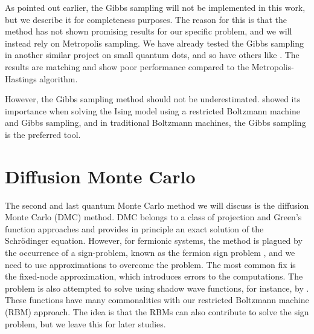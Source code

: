 As pointed out earlier, the Gibbs sampling will not be implemented in this work, but we describe it for completeness purposes. The reason for this is that the method has not shown promising results for our specific problem, and we will instead rely on Metropolis sampling. We have already tested the Gibbs sampling in another similar project on small quantum dots, and so have others like \citet{flugsrud_vilde_moe_solving_nodate}. The results are matching and show poor performance compared to the Metropolis-Hastings algorithm.

However, the Gibbs sampling method should not be underestimated. \citet{carleo_solving_2017} showed its importance when solving the Ising model using a restricted Boltzmann machine and Gibbs sampling, and in traditional Boltzmann machines, the Gibbs sampling is the preferred tool.

\section{Diffusion Monte Carlo} \label{sec:dmc}
The second and last quantum Monte Carlo method we will discuss is the diffusion Monte Carlo (DMC) method. DMC belongs to a class of projection and Green's function approaches and provides in principle an exact solution of the Schrödinger equation. However, for fermionic systems, the method is plagued by the occurrence of a sign-problem, known as the fermion sign problem \supercite{troyer_computational_2005}, and we need to use approximations to overcome the problem. The most common fix is the fixed-node approximation, which introduces errors to the computations. The problem is also attempted to solve using shadow wave functions, for instance, by \citet{calcavecchia_sign_2014}. These functions have many commonalities with our restricted Boltzmann machine (RBM) approach. The idea is that the RBMs can also contribute to solve the sign problem, but we leave this for later studies. 

